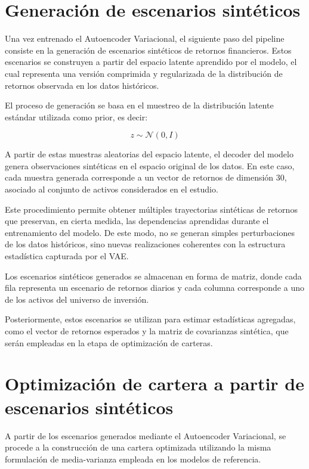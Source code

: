\section{Generación de escenarios sintéticos}

Una vez entrenado el Autoencoder Variacional, el siguiente paso del pipeline consiste en la generación de escenarios sintéticos de retornos financieros. Estos escenarios se construyen a partir del espacio latente aprendido por el modelo, el cual representa una versión comprimida y regularizada de la distribución de retornos observada en los datos históricos.

El proceso de generación se basa en el muestreo de la distribución latente estándar utilizada como prior, es decir:

\begin{equation}
z \sim \mathcal{N}(0, I)
\end{equation}

A partir de estas muestras aleatorias del espacio latente, el decoder del modelo genera observaciones sintéticas en el espacio original de los datos. En este caso, cada muestra generada corresponde a un vector de retornos de dimensión 30, asociado al conjunto de activos considerados en el estudio.

Este procedimiento permite obtener múltiples trayectorias sintéticas de retornos que preservan, en cierta medida, las dependencias aprendidas durante el entrenamiento del modelo. De este modo, no se generan simples perturbaciones de los datos históricos, sino nuevas realizaciones coherentes con la estructura estadística capturada por el VAE.

Los escenarios sintéticos generados se almacenan en forma de matriz, donde cada fila representa un escenario de retornos diarios y cada columna corresponde a uno de los activos del universo de inversión.

Posteriormente, estos escenarios se utilizan para estimar estadísticas agregadas, como el vector de retornos esperados y la matriz de covarianzas sintética, que serán empleadas en la etapa de optimización de carteras.

\section{Optimización de cartera a partir de escenarios sintéticos}

A partir de los escenarios generados mediante el Autoencoder Variacional, se procede a la construcción de una cartera optimizada utilizando la misma formulación de media-varianza empleada en los modelos de referencia.

